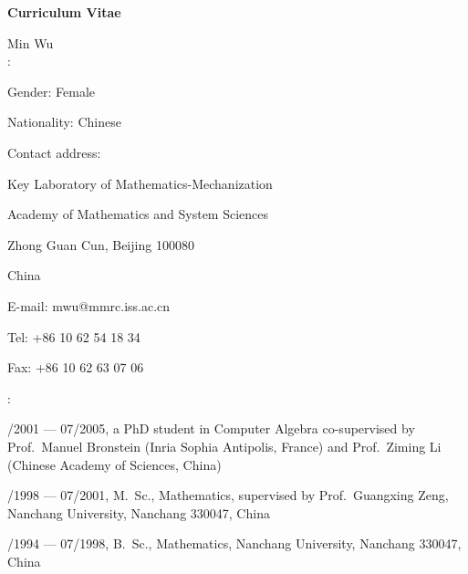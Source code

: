 



\begin{center}
\LARGE{\bf Curriculum Vitae}{}
\end{center}

\bigskip\bigskip\bigskip
\large{\noindent Min Wu\\

:\bigskip

\noindent Gender: Female \par


\noindent Nationality: Chinese\smallskip

\noindent Contact address: \par Key Laboratory of
Mathematics-Mechanization \par Academy of Mathematics and System
Sciences \par Zhong Guan Cun, Beijing 100080\par China \smallskip





\smallskip

\noindent E-mail: %
mwu@mmrc.iss.ac.cn

\noindent Tel: +86 10 62 54 18 34\par \noindent Fax: +86 10 62 63
07 06\par


\medskip\bigskip
{}:\bigskip

/2001 --- 07/2005, a PhD student in Computer Algebra
co-supervised by Prof.\ Manuel Bronstein (Inria Sophia Antipolis,
France) and Prof.\ Ziming Li (Chinese Academy of Sciences,
China)\medskip

/1998 --- 07/2001, M.\ Sc., Mathematics, supervised by
Prof.\ Guangxing Zeng, Nanchang University, Nanchang 330047,
China\medskip

/1994 --- 07/1998,  B.\ Sc., Mathematics, Nanchang
University, Nanchang 330047, China\par


}
